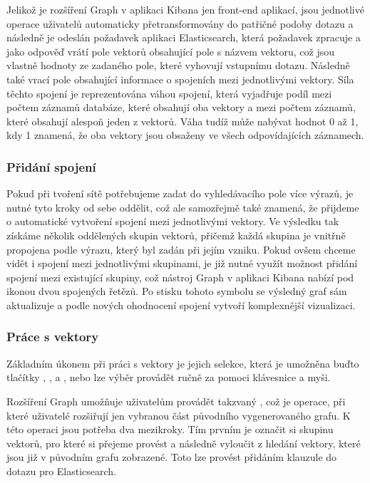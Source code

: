 \documentclass[czech,BP]{thesiskiv}
\begin{document}
Jelikož je rozšíření Graph v aplikaci Kibana jen front-end aplikací, jsou jednotlivé operace uživatelů automaticky přetransformovány do patřičné podoby dotazu a následně je odeslán požadavek aplikaci Elasticsearch, která požadavek zpracuje a jako odpověď vrátí pole vektorů obsahující pole s názvem vektoru, což jsou vlastně hodnoty ze zadaného pole, které vyhovují vstupnímu dotazu. Následně také vrací pole obsahující informace o spojeních mezi jednotlivými vektory. Síla těchto spojení je reprezentována váhou spojení, která vyjadřuje podíl mezi počtem záznamů databáze, které obsahují oba vektory a mezi počtem záznamů, které obsahují alespoň jeden z vektorů. Váha tudíž může nabývat hodnot 0 až 1,  kdy 1 znamená, že oba vektory jsou obsaženy ve všech odpovídajících záznamech.

\subsubsection{Přidání spojení}
Pokud při tvoření sítě potřebujeme zadat do vyhledávacího pole více výrazů, je nutné tyto kroky od sebe oddělit, což ale samozřejmě také znamená, že přijdeme o automatické vytvoření spojení mezi jednotlivými vektory. Ve výsledku tak získáme několik oddělených skupin vektorů, přičemž každá skupina je vnitřně propojena podle výrazu, který byl zadán při jejím vzniku. Pokud ovšem chceme vidět i spojení mezi jednotlivými skupinami, je již nutné využít možnost přidání spojení mezi existující skupiny, což nástroj Graph v aplikaci Kibana nabízí pod ikonou dvou spojených řetězů. Po stisku tohoto symbolu se výsledný graf sám aktualizuje a podle nových ohodnocení spojení vytvoří komplexnější vizualizaci.

\subsubsection{Práce s vektory}
Základním úkonem při práci s vektory je jejich selekce, která je umožněna buďto tlačítky , ,  a , nebo lze výběr provádět ručně za pomoci klávesnice  a myši.


Rozšíření Graph umožňuje uživatelům provádět takzvaný , což je operace, při které uživatelé rozšiřují jen vybranou část původního vygenerovaného grafu. K této operaci jsou potřeba dva mezikroky. Tím prvním je označit si skupinu vektorů, pro které si přejeme provést \textbf{} a následně vyloučit z hledání vektory, které jsou již v původním grafu zobrazené. Toto lze provést přidáním klauzule  do dotazu pro Elasticsearch. \cite{Spidering} 
\end{document}

